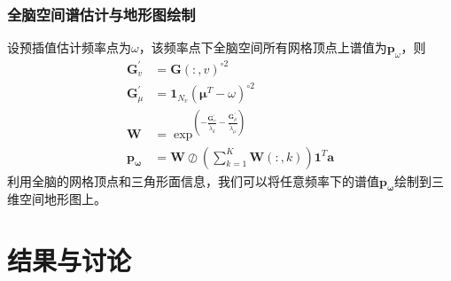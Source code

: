 \subsubsection{全脑空间谱估计与地形图绘制}
设预插值估计频率点为$\omega$，该频率点下全脑空间所有网格顶点上谱值为$\mathbf{p}_\omega$，则
\begin{equation}\label{eq16}
\begin{aligned}
\mathbf{G}^\prime_v& = \mathbf{G}(:,v)^{\circ2}\\
\mathbf{G}^\prime_\mu& = \mathbf{1}_{N_v}(\mathbf{\mu}^T-\omega)^{\circ2}\\
\mathbf{W}& =\exp^{(-\frac{\mathbf{G}^\prime_v}{\tilde{\lambda}_d}-\frac{\mathbf{G}^\prime_\mu}{\tilde{\lambda}_\mu})}\\
\mathbf{p_\omega}& =\mathbf{W}\oslash{(\sum_{k=1}^K\mathbf{W}(:,k))\mathbf{1}^T}\mathbf{a}
\end{aligned}
\end{equation}
利用全脑的网格顶点和三角形面信息，我们可以将任意频率下的谱值$\mathbf{p_\omega}$绘制到三维空间地形图上。

\section{结果与讨论}
